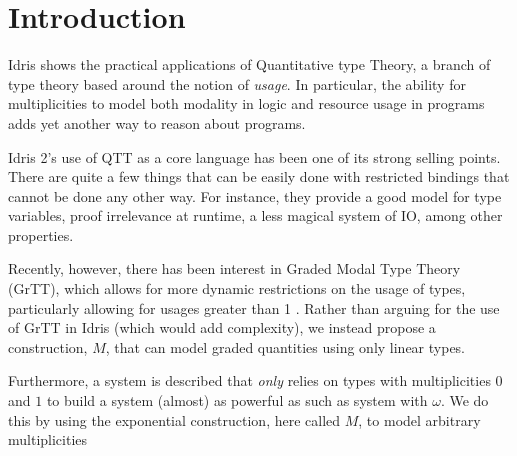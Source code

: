 \section{Introduction}

Idris shows the practical applications of Quantitative type Theory, a branch of type theory based around the notion of \emph{usage}\cite{eb_idris_qtt_prac}.
In particular, the ability for multiplicities to model both modality in logic and resource usage in programs adds yet another way to reason about programs.

Idris 2's use of QTT as a core language has been one of its strong selling points. 
There are quite a few things that can be easily done with restricted bindings that cannot be done any other way.
For instance, they provide a good model for type variables, proof irrelevance at runtime, a less magical system of IO, among other properties.

Recently, however, there has been interest in Graded Modal Type Theory (GrTT), which allows for more dynamic restrictions on the usage of types, particularly allowing for usages greater than 1 \cite{quant_graded_modal}.
Rather than arguing for the use of GrTT in Idris (which would add complexity), we instead propose a construction, $M$, that can model graded quantities using only linear types.

Furthermore, a system is described that \emph{only} relies on types with multiplicities $0$ and $1$ to build a system (almost) as powerful as such as system with $\omega$.
We do this by using the exponential construction, here called $M$, to model arbitrary multiplicities\cite{dep_mult_dep_lin, inverse_of_type}
